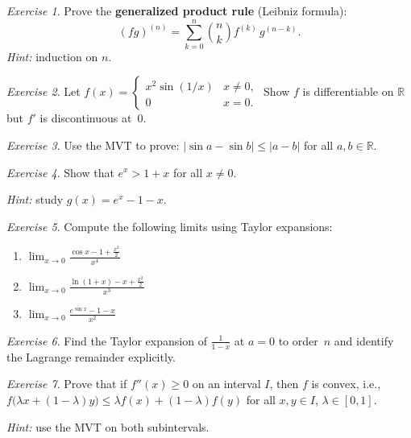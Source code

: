 \documentclass[12pt,a4paper,openany]{book}
\theoremstyle{definition}
\theoremstyle{remark}
\newtheorem{exercise}{Exercise}[chapter]
\begin{document}
\begin{exercise}\label{exo:ch6-3}
Prove the \textbf{generalized product rule} (Leibniz formula):
\[
  (fg)^{(n)} = \sum_{k=0}^{n}\binom{n}{k}f^{(k)}\,g^{(n-k)}.
\]
\emph{Hint:} induction on $n$.
\end{exercise}

\begin{exercise}\label{exo:ch6-4}
Let $f(x)=\begin{cases}x^2\sin(1/x)&x\neq 0,\\0&x=0.\end{cases}$\;
Show $f$ is differentiable on $\mathbb{R}$ but $f'$ is discontinuous
at~$0$.
\end{exercise}

\begin{exercise}\label{exo:ch6-5}
Use the MVT to prove:
$|\sin a - \sin b|\le |a-b|$ for all $a,b\in\mathbb{R}$.
\end{exercise}

\begin{exercise}\label{exo:ch6-6}
Show that $e^x > 1+x$ for all $x\neq 0$.

\emph{Hint:} study $g(x)=e^x-1-x$.
\end{exercise}

\begin{exercise}\label{exo:ch6-7}
Compute the following limits using Taylor expansions:
\begin{enumerate}
\item $\displaystyle\lim_{x\to 0}
  \frac{\cos x - 1 + \frac{x^2}{2}}{x^4}$
\item $\displaystyle\lim_{x\to 0}
  \frac{\ln(1+x)-x+\frac{x^2}{2}}{x^3}$
\item $\displaystyle\lim_{x\to 0}
  \frac{e^{\sin x}-1-x}{x^2}$
\end{enumerate}
\end{exercise}

\begin{exercise}\label{exo:ch6-8}
Find the Taylor expansion of $\frac{1}{1-x}$ at $a=0$ to order~$n$
and identify the Lagrange remainder explicitly.
\end{exercise}

\begin{exercise}\label{exo:ch6-9}
Prove that if $f''(x)\ge 0$ on an interval $I$, then $f$ is convex,
i.e., $f\bigl(\lambda x+(1-\lambda)y\bigr)\le\lambda f(x)+(1-\lambda)f(y)$
for all $x,y\in I$, $\lambda\in[0,1]$.

\emph{Hint:} use the MVT on both subintervals.
\end{exercise}
\end{document}
